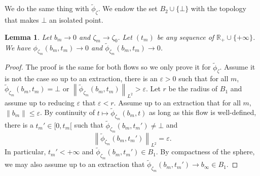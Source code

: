 \documentclass{article}
\newtheorem{lemma}[theorem]{Lemma}
\theoremstyle{remark}
\theoremstyle{definition}
\newcommand{\R}{\mathbb{R}}
\newcommand{\norme}[1]{\left\| #1 \right\|}
\renewcommand{\leq}{\leqslant}
\begin{document}
We do the same thing with $\tilde{\phi}_\zeta$. We endow the set $B_2 \cup \{\bot\}$ with the topology that makes $\bot$ an isolated point.

\begin{lemma}\label{LEM:Continuité en 0}
    Let $b_m \rightarrow 0$ and $\zeta_m \rightarrow \zeta_0$. Let $(t_m)$ be any sequence of $\R_+ \cup \{+\infty\}$. We have $\phi_{\zeta_m}(b_m,t_m) \rightarrow 0$ and $\tilde{\phi}_{\zeta_m}(b_m,t_m) \rightarrow 0$.
\end{lemma}
\begin{proof}
The proof is the same for both flows so we only prove it for $\tilde{\phi}_\zeta$. Assume it is not the case so up to an extraction, there is an $\varepsilon > 0$ such that for all $m$, $\tilde{\phi}_{\zeta_m}(b_m,t_m) = \bot$ or $\norme{\tilde{\phi}_{\zeta_m}(b_m,t_m)}_{L^2} > \varepsilon$. Let $r$ be the radius of $B_1$ and assume up to reducing $\varepsilon$ that $\varepsilon < r$. Assume up to an extraction that for all $m$, $\norme{b_m} \leq \varepsilon$. By continuity of $t \mapsto \tilde{\phi}_{\zeta_m}(b_m,t)$ as long as this flow is well-defined, there is a $t_m' \in [0,t_m[$ such that $\tilde{\phi}_{\zeta_m}(b_m,t_m') \neq \bot$ and
$$
\norme{\tilde{\phi}_{\zeta_m}(b_m,t_m')}_{L^2} = \varepsilon.
$$
In particular, $t_m' < +\infty$ and $\tilde{\phi}_{\zeta_m}(b_m,t_m') \in B_1$. By compactness of the sphere, we may also assume up to an extraction that $\tilde{\phi}_{\zeta_m}(b_m,t_m') \rightarrow b_\infty \in B_1$.


\end{proof}
\end{document}
